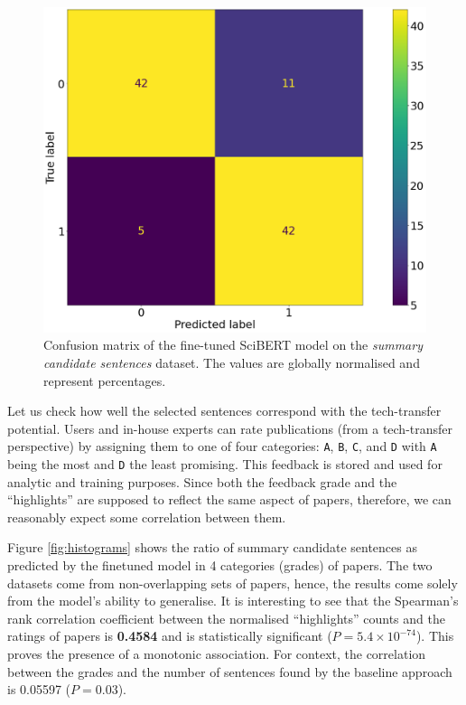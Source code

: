 \begin{figure}
    \centering
    \includegraphics[width=0.4\linewidth]{figures/scibert-confusion.png}
    \caption{Confusion matrix of the fine-tuned SciBERT model on the \textit{summary candidate sentences} dataset. The values are globally normalised and represent percentages.}
    \label{fig:scibert-confusion}
\end{figure}

Let us check how well the selected sentences correspond with the tech-transfer potential. Users and in-house experts can rate publications (from a tech-transfer perspective) by assigning them to one of four categories: \texttt{A}, \texttt{B}, \texttt{C}, and \texttt{D} with \texttt{A} being the most and \texttt{D} the least promising. This feedback is stored and used for analytic and training purposes. Since both the feedback grade and the ``highlights'' are supposed to reflect the same aspect of papers, therefore, we can reasonably expect some correlation between them.

Figure \ref{fig:histograms} shows the ratio of summary candidate sentences as predicted by the finetuned model in 4 categories (grades) of papers. The two datasets come from non-overlapping sets of papers, hence, the results come solely from the model's ability to generalise. It is interesting to see that the Spearman's rank correlation coefficient \cite{spearman1961proof} between the normalised ``highlights'' counts and the ratings of papers is \textbf{0.4584} and is statistically significant ($P = 5.4 \times 10^{-74}$). This proves the presence of a monotonic association. For context, the correlation between the grades and the number of sentences found by the baseline approach is 0.05597 ($P = 0.03$).

